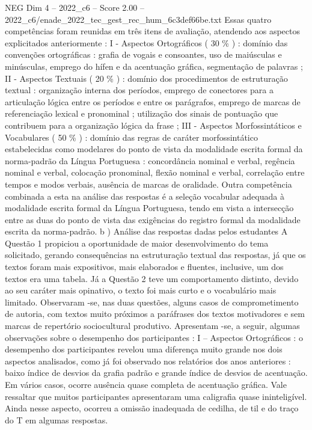 \begin{textsample}{NEG Dim 4 – 2022\_c6 – Score 2.00 – 2022\_c6/enade\_2022\_tec\_gest\_rec\_hum\_6c3def66be.txt}
Essas quatro competências foram reunidas em três itens de avaliação, atendendo aos aspectos explicitados anteriormente : I - Aspectos Ortográficos ( 30 \% ) : domínio das convenções ortográficas : grafia de vogais e consoantes, uso de maiúsculas e minúsculas, emprego do hífen e da acentuação gráfica, segmentação de palavras ; II - Aspectos Textuais ( 20 \% ) : domínio dos procedimentos de estruturação textual : organização interna dos períodos, emprego de conectores para a articulação lógica entre os períodos e entre os parágrafos, emprego de marcas de referenciação lexical e pronominal ; utilização dos sinais de pontuação que contribuem para a organização lógica da frase ; III - Aspectos Morfossintáticos e Vocabulares ( 50 \% ) : domínio das regras de caráter morfossintático estabelecidas como modelares do ponto de vista da modalidade escrita formal da norma-padrão da Língua Portuguesa : concordância nominal e verbal, regência nominal e verbal, colocação pronominal, flexão nominal e verbal, correlação entre tempos e modos verbais, ausência de marcas de oralidade.
Outra competência combinada a esta na análise das respostas é a seleção vocabular adequada à modalidade escrita formal da Língua Portuguesa, tendo em vista a intersecção entre as duas do ponto de vista das exigências do registro formal da modalidade escrita da norma-padrão. b ) Análise das respostas dadas pelos estudantes A Questão 1 propiciou a oportunidade de maior desenvolvimento do tema solicitado, gerando consequências na estruturação textual das respostas, já que os textos foram mais expositivos, mais elaborados e fluentes, inclusive, um dos textos era uma tabela.
Já a Questão 2 teve um comportamento distinto, devido ao seu caráter mais opinativo, o texto foi mais curto e o vocabulário mais limitado.
Observaram -se, nas duas questões, alguns casos de comprometimento de autoria, com textos muito próximos a paráfrases dos textos motivadores e sem marcas de repertório sociocultural produtivo.
Apresentam -se, a seguir, algumas observações sobre o desempenho dos participantes : I – Aspectos Ortográficos : o desempenho dos participantes revelou uma diferença muito grande nos dois aspectos analisados, como já foi observado nos relatórios dos anos anteriores : baixo índice de desvios da grafia padrão e grande índice de desvios de acentuação.
Em vários casos, ocorre ausência quase completa de acentuação gráfica.
Vale ressaltar que muitos participantes apresentaram uma caligrafia quase ininteligível.
Ainda nesse aspecto, ocorreu a omissão inadequada de cedilha, de til e do traço do T em algumas respostas.

\end{textsample}

